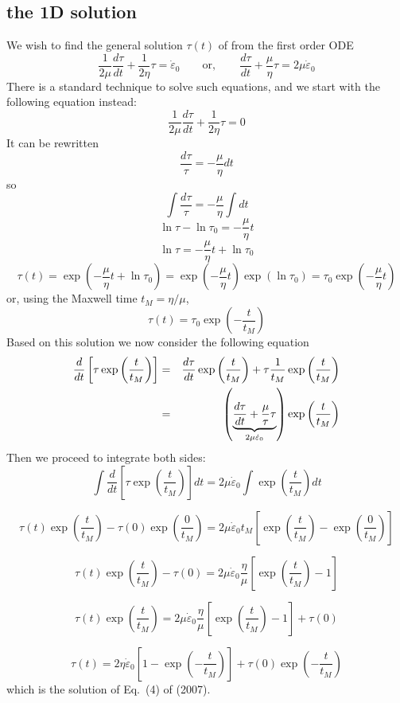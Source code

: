\subsection{the 1D solution}
We wish to find the general solution $\tau(t)$ of from the first order ODE
\[
\frac{1}{2\mu} \frac{d\tau}{dt} + \frac{1}{2\eta} \tau = \dot\varepsilon_0
\qquad
\text{or},
\qquad
\frac{d\tau}{dt} + \frac{\mu}{\eta} \tau = 2\mu \dot\varepsilon_0
\]
There is a standard technique to solve such equations, and we start with the following equation instead:
\[
\frac{1}{2\mu} \frac{d\tau}{dt} + \frac{1}{2\eta} \tau = 0
\]
It can be rewritten
\[
\frac{d\tau}{\tau} = -\frac{\mu}{\eta} dt
\]
so
\[
\int \frac{d\tau}{\tau} = -\frac{\mu}{\eta} \int dt
\]
\[
\ln \tau - \ln \tau_0 = -\frac{\mu}{\eta} t 
\]
\[
\ln \tau = -\frac{\mu}{\eta} t  + \ln \tau_0
\]
\[
\tau(t) 
= \exp \left(  -\frac{\mu}{\eta} t  + \ln \tau_0 \right) 
= \exp \left(  -\frac{\mu}{\eta} t   \right)   \exp \left(  \ln \tau_0 \right) 
= \tau_0 \exp \left(  -\frac{\mu}{\eta} t   \right) 
\]
or, using the Maxwell time $t_M=\eta/\mu$,
\[
\tau(t) 
= \tau_0 \exp \left(  -\frac{t}{t_M}   \right) 
\]
Based on this solution we now 
consider the following equation
\begin{eqnarray}
\frac{d}{dt} \left[   \tau \exp\left( \frac{t}{t_M}   \right)  \right]
&=& 
\frac{d \tau}{dt}  \exp\left( \frac{t}{t_M}   \right)  +
\tau \frac{1}{t_M} \exp\left( \frac{t}{t_M}   \right)  \nonumber\\
&=& 
\left( \underbrace{\frac{d \tau}{dt} + \frac{\mu}{\tau} \tau}_{2\mu \dot\varepsilon_0}  \right)  \exp\left( \frac{t}{t_M}   \right)  \nonumber
\end{eqnarray}
Then we proceed to integrate both sides:
\[
\int \frac{d}{dt} \left[   \tau \exp\left( \frac{t}{t_M}   \right)  \right] dt
= 2\mu \dot\varepsilon_0 \int \exp\left( \frac{t}{t_M}   \right)  dt
\]

\[
\tau(t) \exp\left( \frac{t}{t_M}   \right)
-
\tau(0) \exp\left( \frac{0}{t_M}   \right)
 =
 2\mu \dot\varepsilon_0  t_M  [ \exp\left( \frac{t}{t_M}   \right)  -  \exp\left( \frac{0}{t_M} \right) ]
\]

\[
\tau(t) \exp\left( \frac{t}{t_M}   \right)
- \tau(0) 
=
2 \mu  \dot\varepsilon_0 \frac{\eta}{\mu} [ \exp\left( \frac{t}{t_M}   \right) -1 ]
\]

\[
\tau(t) \exp\left( \frac{t}{t_M} \right)
=
2 \mu  \dot\varepsilon_0 \frac{\eta}{\mu} [ \exp\left( \frac{t}{t_M}   \right) -1 ] + \tau(0) 
\]

\[
\tau(t) 
=
2 \eta  \dot\varepsilon_0  [1- \exp\left( -\frac{t}{t_M}\right) ] + \tau(0) \exp\left( -\frac{t}{t_M} \right)
\]
which is the solution of Eq.~(4) of \textcite{kabe07} (2007).

